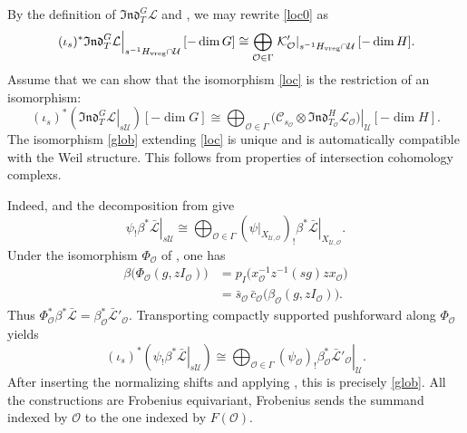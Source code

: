 \documentclass[11pt,letterpaper]{amsart}
\theoremstyle{definition}
\numberwithin{equation}{section}
\numberwithin{theorem}{section}
\begin{document}
By the definition of $\mathfrak{Ind}^{G}_{T}\mathcal{L}$ and
, we may rewrite
\eqref{loc0} as
\begin{equation}\label{loc}
 \left.(\iota_s)^*\mathfrak{Ind}^{G}_{T}\mathcal L
 \right|_{s^{-1}H_{\rm vreg}\cap\mathcal U}[-\dim G]
 \cong
 \bigoplus_{\mathcal O\in\Gamma}
 \left.
  \mathcal K'_{\mathcal O}
 \right|_{s^{-1}H_{\rm vreg}\cap\mathcal U}[-\dim H].
\end{equation}
Assume that we can show that the isomorphism \ref{loc} is the restriction of an isomorphism:
\begin{equation}\label{glob}
 (\iota_s)^*\left(
   \left.\mathfrak{Ind}^{G}_{T}\mathcal L\right|_{s\mathcal U}
 \right)[-\dim G]
 \cong
 \bigoplus_{\mathcal O\in\Gamma}
 \left.
 \bigl(\mathcal C_{s_{\mathcal O}}\otimes
       \mathfrak{Ind}^{H}_{T_{\mathcal O}}\mathcal L_{\mathcal O}\bigr)
 \right|_{\mathcal U}[-\dim H].
\end{equation}
The isomorphism \ref{glob} extending \ref{loc} is unique and is automatically compatible with the Weil structure. This follows from properties of intersection cohomology complexs.



Indeed,  and the
decomposition from  give
\[
 \left.\psi_!\beta^*\bar{\mathcal L}\right|_{s\mathcal U}
 \cong
 \bigoplus_{\mathcal O\in\Gamma}
 (\psi|_{X_{\mathcal U,\mathcal O}})_!
 \left.\beta^*\bar{\mathcal L}\right|_{X_{\mathcal U,\mathcal O}}.
\]
Under the isomorphism $\Phi_{\mathcal O}$ of
, one has
\begin{align*}
 \beta\bigl(\Phi_{\mathcal O}(g,zI_{\mathcal O})\bigr)
 &=p_I\bigl(x_{\mathcal O}^{-1}z^{-1}(sg)zx_{\mathcal O}\bigr)\\
 &=\bar s_{\mathcal O}\,
   \bar c_{\mathcal O}\bigl(\beta_{\mathcal O}(g,zI_{\mathcal O})\bigr).
\end{align*}
Thus $\Phi_{\mathcal O}^*\beta^*\bar{\mathcal L}
=\beta_{\mathcal O}^*\bar{\mathcal L}'_{\mathcal O}$. Transporting
compactly supported pushforward along $\Phi_{\mathcal O}$ yields
\[
 (\iota_s)^*
 \left(\left.\psi_!\beta^*\bar{\mathcal L}\right|_{s\mathcal U}\right)
 \cong
 \bigoplus_{\mathcal O\in\Gamma}
 \left.({\psi_{\mathcal O}})_!
 \beta_{\mathcal O}^*\bar{\mathcal L}'_{\mathcal O}
 \right|_{\mathcal U}.
\]
After inserting the normalizing shifts and applying
, this is precisely
\eqref{glob}. All the constructions
are Frobenius equivariant, Frobenius sends the summand indexed by
$\mathcal O$ to the one indexed by $F(\mathcal O)$.
\end{document}
